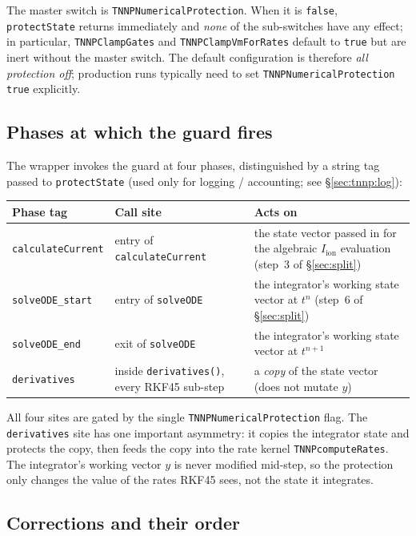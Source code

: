 \documentclass[11pt,a4paper]{article}
\newcommand{\Iion}{I_{\text{ion}}}
\newcommand{\code}[1]{\texttt{\small #1}}
\begin{document}
The master switch is \code{TNNPNumericalProtection}. When it is
\code{false}, \code{protectState} returns immediately and \emph{none}
of the sub-switches have any effect; in particular,
\code{TNNPClampGates} and \code{TNNPClampVmForRates} default to
\code{true} but are inert without the master switch. The default
configuration is therefore \emph{all protection off}; production runs
typically need to set \code{TNNPNumericalProtection true} explicitly.

\subsection{Phases at which the guard fires}
\label{sec:tnnp:phases}

The wrapper invokes the guard at four phases, distinguished by a
string tag passed to \code{protectState} (used only for logging /
accounting; see \S\ref{sec:tnnp:log}):

\begin{center}
\begin{tabular}{@{}lll@{}}
\toprule
Phase tag & Call site & Acts on \\
\midrule
\code{calculateCurrent} & entry of \code{calculateCurrent}
   & the state vector passed in for the algebraic
     $\Iion$ evaluation (step~3 of \S\ref{sec:split}) \\
\code{solveODE\_start}  & entry of \code{solveODE}
   & the integrator's working state vector at $t^{n}$
     (step~6 of \S\ref{sec:split}) \\
\code{solveODE\_end}    & exit of \code{solveODE}
   & the integrator's working state vector at $t^{n+1}$ \\
\code{derivatives}      & inside \code{derivatives()}, every
                          RKF45 sub-step
   & a \emph{copy} of the state vector (does not mutate $y$) \\
\bottomrule
\end{tabular}
\end{center}

All four sites are gated by the single \code{TNNPNumericalProtection}
flag. The \code{derivatives} site has one important asymmetry: it
copies the integrator state and protects the copy, then feeds the
copy into the rate kernel \code{TNNPcomputeRates}. The integrator's
working vector $y$ is never modified mid-step, so the protection only
changes the value of the rates RKF45 sees, not the state it
integrates.

\subsection{Corrections and their order}
\label{sec:tnnp:steps}
\end{document}
